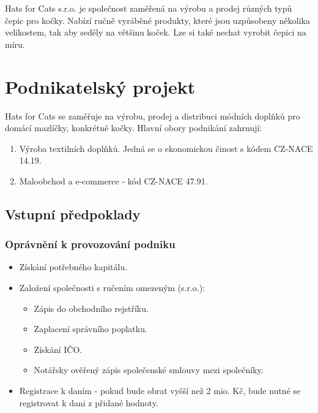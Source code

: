 \documentclass[12pt, a4paper]{article}
\begin{document}
\vspace{10pt}

\noindent Hats for Cats s.r.o. je společnost zaměřená na výrobu a prodej různých typů čepic pro kočky.
Nabízí ručně vyráběné produkty, které jsou uzpůsobeny několika velikostem, tak aby seděly na většinu koček.
Lze si také nechat vyrobit čepici na míru.

\pagebreak

\section{Podnikatelský projekt}

Hats for Cats se zaměřuje na výrobu, prodej a distribuci módních doplňků pro domácí mazlíčky, konkrétně kočky. 
Hlavní obory podnikání zahrnují:

\begin{enumerate}
  \item Výroba textilních doplňků. Jedná se o ekonomickou činost s kódem CZ-NACE 14.19.
  \item Maloobchod a e-commerce - kód CZ-NACE 47.91.
\end{enumerate}

\subsection{Vstupní předpoklady}

\subsubsection{Oprávnění k provozování podniku}
\begin{itemize}
  \item Získání potřebného kapitálu.
  \item Založení společnosti s ručením omezeným (s.r.o.):
  \begin{itemize}
    \item Zápis do obchodního rejstříku.
    \item Zaplacení správního poplatku.
    \item Získání IČO.
    \item Notářsky ověřený zápis společenské smlouvy mezi společníky.
  \end{itemize}
  \item{Registrace k daním} - pokud bude obrat vyšší než 2 mio. Kč, bude nutné se registrovat k dani z přidané hodnoty.
\end{itemize}
\end{document}
